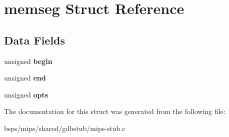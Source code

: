 \hypertarget{structmemseg}{}\section{memseg Struct Reference}
\label{structmemseg}
\subsection*{Data Fields}
\begin{DoxyCompactItemize}
\item 
\mbox{\label{structmemseg_a763eac48516ce77da46c761a70ec3ff7}} 
unsigned {\bfseries begin}
\item 
\mbox{\label{structmemseg_acb3c35c871c3ecaa00f1e71401f3cc93}} 
unsigned {\bfseries end}
\item 
\mbox{\label{structmemseg_abc738e91272d6cee1327ed90106caeca}} 
unsigned {\bfseries opts}
\end{DoxyCompactItemize}


The documentation for this struct was generated from the following file\+:\begin{DoxyCompactItemize}
\item 
bsps/mips/shared/gdbstub/mips-\/stub.\+c\end{DoxyCompactItemize}
